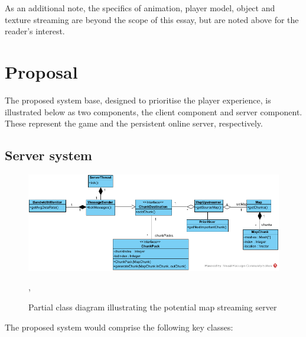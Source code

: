\documentclass{scrartcl}
\begin{document}
As an additional note, the specifics of animation, player model, object and texture streaming are beyond the scope of this essay, but are noted above for the reader's interest.

\section{Proposal}
The proposed system base, designed to prioritise the player experience, is illustrated below as two components, the client component and server component. These represent the game and the persistent online server, respectively.

\subsection{Server system}
\begin{figure}[H]
	\centering
	\includegraphics[width=1.0\linewidth]{Server_Side_Streamer.png}
	\caption{Partial class diagram illustrating the potential map streaming server},
	\label{fig:serversystem}
\end{figure}

The proposed system would comprise the following key classes:
\end{document}
